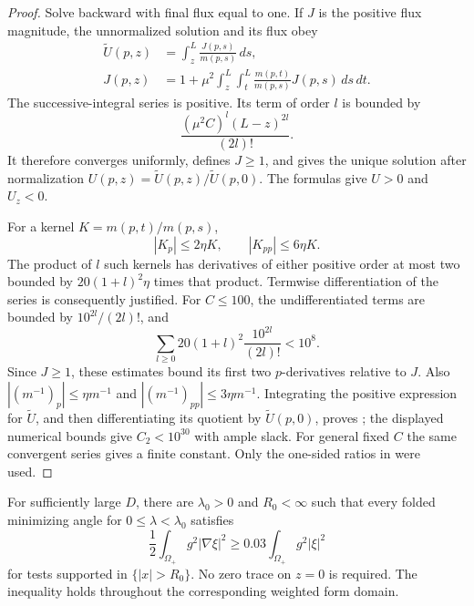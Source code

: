 \begin{proof}
Solve backward with final flux equal to one.  If \(J\) is the positive
flux magnitude, the unnormalized solution and its flux obey
\begin{equation}\label{eq:strip-volterra}
 \begin{aligned}
 \widetilde U(p,z)&=\int_z^L\frac{J(p,s)}{m(p,s)}\,ds,\\
 J(p,z)&=1+\mu^2\int_z^L\int_t^L
                \frac{m(p,t)}{m(p,s)}J(p,s)\,ds\,dt.
 \end{aligned}
\end{equation}
The successive-integral series is positive.  Its term of order \(l\)
is bounded by
\[
 \frac{(\mu^2 C)^l(L-z)^{2l}}{(2l)!}.
\]
It therefore converges uniformly, defines \(J\ge1\), and gives the
unique solution after normalization
\(U(p,z)=\widetilde U(p,z)/\widetilde U(p,0)\).
The formulas give \(U>0\) and \(U_z<0\).

For a kernel \(K=m(p,t)/m(p,s)\),
\[
 |K_p|\le2\eta K,\qquad |K_{pp}|\le6\eta K.
\]
The product of \(l\) such kernels has derivatives of either positive
order at most two bounded by \(20(1+l)^2\eta\) times that product.
Termwise differentiation of the series is consequently justified.
For \(C\le100\), the undifferentiated terms are bounded by
\(10^{2l}/(2l)!\), and
\[
 \sum_{l\ge0}20(1+l)^2\frac{10^{2l}}{(2l)!}<10^8.
\]
Since \(J\ge1\), these estimates bound its first two \(p\)-derivatives
relative to \(J\).  Also
\(|(m^{-1})_p|\le\eta m^{-1}\) and
\(|(m^{-1})_{pp}|\le3\eta m^{-1}\).
Integrating the positive expression for \(\widetilde U\), and then
differentiating its quotient by \(\widetilde U(p,0)\), proves
; the displayed numerical bounds
give \(C_2<10^{30}\) with ample slack.
For general fixed \(C\) the same convergent series gives a finite
constant.  Only the one-sided ratios in
 were used.
\end{proof}

\begin{proposition}\label{prop:exterior-gap}
For sufficiently large \(D\), there are \(\lambda_0>0\) and \(R_0<\infty\)
such that every folded minimizing angle for
\(0\le\lambda<\lambda_0\) satisfies
\begin{equation}\label{eq:exterior-weighted-gap}
 \frac12\int_{\Omega_+}g^2|\nabla\xi|^2
       \ge0.03\int_{\Omega_+}g^2|\xi|^2
\end{equation}
for tests supported in \(\{|x|>R_0\}\).
No zero trace on \(z=0\) is required.
The inequality holds throughout the corresponding weighted form domain.
\end{proposition}

